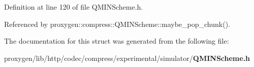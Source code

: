 Definition at line 120 of file Q\+M\+I\+N\+Scheme.\+h.



Referenced by proxygen\+::compress\+::\+Q\+M\+I\+N\+Scheme\+::maybe\+\_\+pop\+\_\+chunk().



The documentation for this struct was generated from the following file\+:\begin{DoxyCompactItemize}
\item 
proxygen/lib/http/codec/compress/experimental/simulator/{\bf Q\+M\+I\+N\+Scheme.\+h}\end{DoxyCompactItemize}
